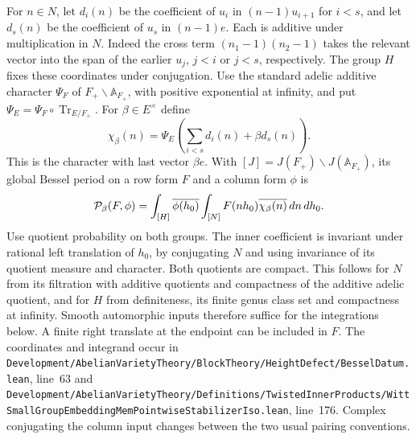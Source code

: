 \documentclass[a4paper,11pt]{article}
\theoremstyle{definition}
\theoremstyle{remark}
\newcommand{\srcloc}[2]{{\small\nolinkurl{#1.lean}}, line~#2}
\numberwithin{equation}{section}
\begin{document}
For \(n\in N\), let \(d_i(n)\) be the coefficient of \(u_i\) in
\((n-1)u_{i+1}\) for \(i<s\), and let \(d_s(n)\) be the coefficient
of \(u_s\) in \((n-1)e\). Each is additive under multiplication in
\(N\). Indeed the cross term \((n_1-1)(n_2-1)\) takes the relevant
vector into the span of the earlier \(u_j\), \(j<i\) or \(j<s\),
respectively. The group \(H\) fixes these coordinates under
conjugation. Use the standard adelic additive character \(\Psi_F\)
of \(F_+\backslash\mathbb A_{F_+}\), with positive exponential at
infinity, and put \(\Psi_E=\Psi_F\circ\operatorname{Tr}_{E/F_+}\).
For \(\beta\in E^\times\) define
\[
 \chi_\beta(n)=\Psi_E\!\left(\sum_{i<s}d_i(n)+\beta d_s(n)\right).
\]
This is the character with last vector \(\beta e\). With
\([J]=J(F_+)\backslash J(\mathbb A_{F_+})\), its global Bessel
period on a row form \(F\) and a column form \(\phi\) is
\begin{equation}
 {\cal P}_\beta(F,\phi)
   =\int_{[H]}\overline{\phi(h_0)}
       \int_{[N]} F(nh_0)\overline{\chi_\beta(n)}\,dn\,dh_0 .
 \label{eq:period94}
\end{equation}
Use quotient probability on both groups. The inner coefficient is
invariant under rational left translation of \(h_0\), by conjugating
\(N\) and using invariance of its quotient measure and character.
Both quotients are compact. This follows for \(N\) from its
filtration with additive quotients and compactness of the additive
adelic quotient, and for \(H\) from definiteness, its finite genus
class set and compactness at infinity. Smooth automorphic inputs
therefore suffice for the integrations below. A finite right
translate at the endpoint can be included in \(F\). The coordinates
and integrand occur in
\srcloc{Development/AbelianVarietyTheory/BlockTheory/HeightDefect/BesselDatum}{63}
and
\srcloc{Development/AbelianVarietyTheory/Definitions/TwistedInnerProducts/WittSmallGroupEmbeddingMemPointwiseStabilizerIso}{176}.
Complex conjugating the column input changes between the two usual
pairing conventions.
\end{document}
